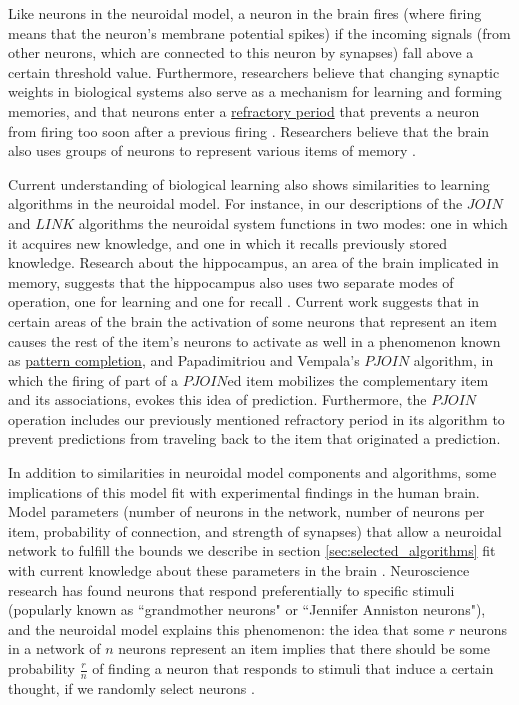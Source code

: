 \documentclass[letterpaper, 12pt]{article}
\begin{document}
Like neurons in the neuroidal model, a neuron in the brain fires (where firing means that the neuron's membrane potential spikes) if the incoming signals (from other neurons, which are connected to this neuron by synapses) fall above a certain threshold value. Furthermore, researchers believe that changing synaptic weights in biological systems also serve as a mechanism for learning and forming memories, and that neurons enter a \underline{refractory period} that prevents a neuron from firing too soon after a previous firing \cite{cooper_donald_2005}. Researchers believe that the brain also uses groups of neurons to represent various items of memory \cite{schacter_richard_1978}.

Current understanding of biological learning also shows similarities to learning algorithms in the neuroidal model. For instance, in our descriptions of the $JOIN$ and $LINK$ algorithms the neuroidal system functions in two modes: one in which it acquires new knowledge, and one in which it recalls previously stored knowledge. Research about the hippocampus, an area of the brain implicated in memory, suggests that the hippocampus also uses two separate modes of operation, one for learning and one for recall \cite{treves_computational_1992}. Current work suggests that in certain areas of the brain the activation of some neurons that represent an item causes the rest of the item's neurons to activate as well in a phenomenon known as \underline{pattern completion}, and Papadimitriou and Vempala's $PJOIN$ algorithm, in which the firing of part of a $PJOIN$ed item mobilizes the complementary item and its associations, evokes this idea of prediction. Furthermore, the $PJOIN$ operation includes our previously mentioned refractory period in its algorithm to prevent predictions from traveling back to the item that originated a prediction.

In addition to similarities in neuroidal model components and algorithms, some implications of this model fit with experimental findings in the human brain. Model parameters (number of neurons in the network, number of neurons per item, probability of connection, and strength of synapses) that allow a neuroidal network to fulfill the bounds we describe in section \ref{sec:selected_algorithms} fit with current knowledge about these parameters in the brain \cite{valiant_memorization_2005, valiant_quantitative_2006}. Neuroscience research has found neurons that respond preferentially to specific stimuli (popularly known as ``grandmother neurons" or ``Jennifer Anniston neurons"), and the neuroidal model explains this phenomenon: the idea that some $r$ neurons in a network of $n$ neurons represent an item implies that there should be some probability $\frac{r}{n}$ of finding a neuron that responds to stimuli that induce a certain thought, if we randomly select neurons \cite{quiroga_invariant_2005, valiant_quantitative_2006}.
\end{document}
